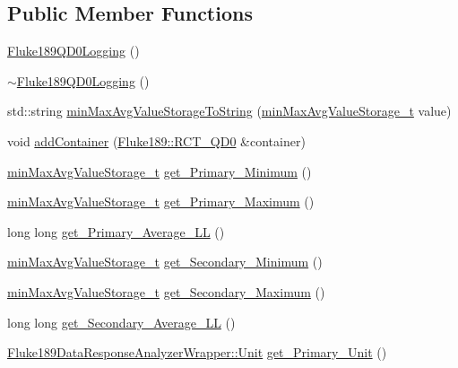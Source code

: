 \subsection*{Public Member Functions}
\begin{DoxyCompactItemize}
\item 
\hyperlink{classFluke_1_1Fluke189QD0Logging_ab856daf79c71ace0841c10c9f9b8f9e6}{Fluke189QD0Logging} ()
\item 
\hyperlink{classFluke_1_1Fluke189QD0Logging_ac134feed3bec91193ba7ffd119f9833d}{$\sim$Fluke189QD0Logging} ()
\item 
std::string \hyperlink{classFluke_1_1Fluke189QD0Logging_a328f1e4b632082f62d461fd4ba6eb838}{minMaxAvgValueStorageToString} (\hyperlink{structFluke_1_1Fluke189QD0Logging_1_1minMaxAvgValueStorage__t}{minMaxAvgValueStorage\_\-t} value)
\item 
void \hyperlink{classFluke_1_1Fluke189QD0Logging_af06d4058c124e5b13893311145d529d2}{addContainer} (\hyperlink{classFluke_1_1Fluke189_a9a5b405bb506cd2482de2f8bb0bea189}{Fluke189::RCT\_\-QD0} \&container)
\item 
\hyperlink{structFluke_1_1Fluke189QD0Logging_1_1minMaxAvgValueStorage__t}{minMaxAvgValueStorage\_\-t} \hyperlink{classFluke_1_1Fluke189QD0Logging_a61180ec1e3f4ffc507c5cc92bfa61952}{get\_\-Primary\_\-Minimum} ()
\item 
\hyperlink{structFluke_1_1Fluke189QD0Logging_1_1minMaxAvgValueStorage__t}{minMaxAvgValueStorage\_\-t} \hyperlink{classFluke_1_1Fluke189QD0Logging_a7da9ac7b5617e427cdfc1b09d6bd4373}{get\_\-Primary\_\-Maximum} ()
\item 
long long \hyperlink{classFluke_1_1Fluke189QD0Logging_a29473a5a7d016d020f0948fcf3e31e50}{get\_\-Primary\_\-Average\_\-LL} ()
\item 
\hyperlink{structFluke_1_1Fluke189QD0Logging_1_1minMaxAvgValueStorage__t}{minMaxAvgValueStorage\_\-t} \hyperlink{classFluke_1_1Fluke189QD0Logging_a447e04b2f508cb4a821c2842b96115ae}{get\_\-Secondary\_\-Minimum} ()
\item 
\hyperlink{structFluke_1_1Fluke189QD0Logging_1_1minMaxAvgValueStorage__t}{minMaxAvgValueStorage\_\-t} \hyperlink{classFluke_1_1Fluke189QD0Logging_a368a2503ede00bd9ef45937fc76278ea}{get\_\-Secondary\_\-Maximum} ()
\item 
long long \hyperlink{classFluke_1_1Fluke189QD0Logging_a1f33bcc2d2342018f0a1ef5b4ec3caa0}{get\_\-Secondary\_\-Average\_\-LL} ()
\item 
\hyperlink{classFluke_1_1Fluke189DataResponseAnalyzerWrapper_ab8e5f2306e4d2ad3d741d273793aaed1}{Fluke189DataResponseAnalyzerWrapper::Unit} \hyperlink{classFluke_1_1Fluke189QD0Logging_a864f0f60f6995d5d035163caf0651565}{get\_\-Primary\_\-Unit} ()

\end{DoxyCompactItemize}
